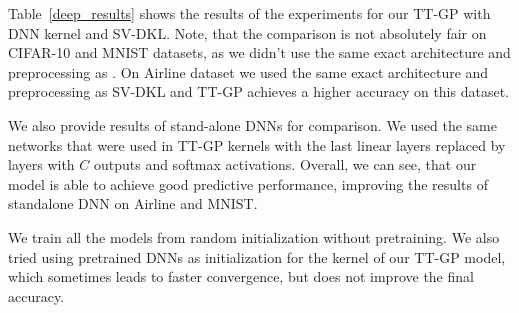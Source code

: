   Table~\ref{deep_results} shows the results of the experiments for our TT-GP
  with DNN kernel and SV-DKL. Note, that the comparison
  is not absolutely fair on CIFAR-10 and MNIST datasets, as we didn't use
  the same exact architecture and preprocessing as \citet{wilson2016stochastic}.
  On Airline dataset we used the same exact architecture and preprocessing as
  SV-DKL and TT-GP achieves a higher accuracy on this dataset.

  We also provide results of stand-alone DNNs for comparison. We used the
  same networks that were used in TT-GP kernels with the last linear layers replaced
  by layers with $C$ outputs and softmax activations. Overall, we can see, that
  our model is able to achieve good predictive performance,
  improving the results of standalone DNN on Airline and MNIST.

  We train all the models from random initialization without pretraining. We also
  tried using pretrained DNNs as initialization for the kernel of our TT-GP model,
  which sometimes leads to faster convergence, but does not improve the final
  accuracy.
